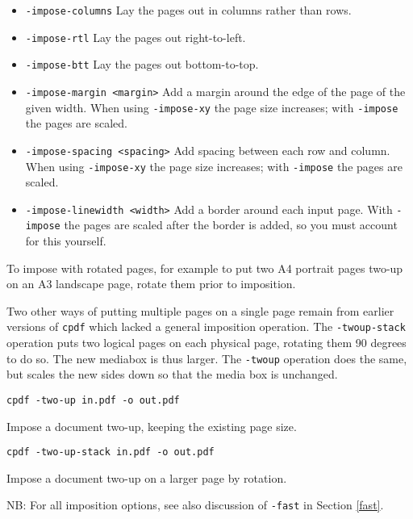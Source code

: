 \documentclass{book}
\begin{document}
\begin{itemize}
\item \texttt{-impose-columns} Lay the pages out in columns rather than rows.
\item \texttt{-impose-rtl} Lay the pages out right-to-left.
\item \texttt{-impose-btt} Lay the pages out bottom-to-top.
\item \texttt{-impose-margin <margin>} Add a margin around the edge of the page of the given width. When using \texttt{-impose-xy} the page size increases; with \texttt{-impose} the pages are scaled.
\item \texttt{-impose-spacing <spacing>} Add spacing between each row and column. When using \texttt{-impose-xy} the page size increases; with \texttt{-impose} the pages are scaled.
\item \texttt{-impose-linewidth <width>} Add a border around each input page. With \texttt{-impose} the pages are scaled after the border is added, so you must account for this yourself.

\end{itemize}

To impose with rotated pages, for example to put two A4 portrait pages two-up on an A3 landscape page, rotate them prior to imposition.

Two other ways of putting multiple pages on a single page remain from earlier versions of \texttt{cpdf} which lacked a general imposition operation.  The \texttt{-twoup-stack} operation puts two logical pages on each physical
page, rotating them 90 degrees to do so. The new mediabox is thus larger. The \texttt{-twoup} operation does the same, but scales the new sides down so
that the media box is unchanged.

  \begin{framed}
    \small\verb!cpdf -two-up in.pdf -o out.pdf!
 
    \vspace{2.5mm}
    \noindent Impose a document two-up, keeping the existing page size.

    \small\verb!cpdf -two-up-stack in.pdf -o out.pdf!
 
    \vspace{2.5mm}
    \noindent Impose a document two-up on a larger page by rotation. 
  \end{framed}
 
NB: For all imposition options, see also discussion of \texttt{-fast} in Section \ref{fast}.
\end{document}
